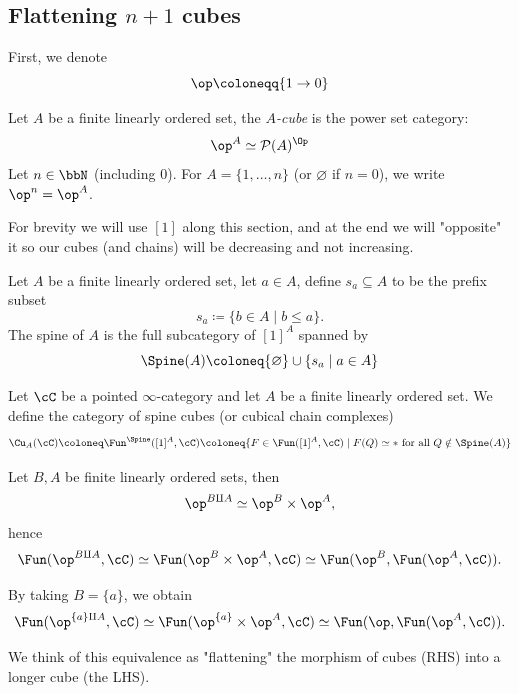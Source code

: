 \subsection{Flattening $n+1$ cubes}\label{sec:ChModels.Cub}

First, we denote
\[
    \op \coloneqq \{1 \to 0\}
\]

\begin{defn}\label{def:A_cube}
Let $A$ be a finite linearly ordered set, the \emph{$A$-cube} is the power set category:
\[
    \op^A \simeq \mathcal{P}(A)^{\Op}
\]
Let $n \in \bbN$ (including $0$). For $A = \{1, \dots, n\}$ (or $\varnothing$ if $n=0$), we write $\op^n = \op^A$.
\end{defn}

\begin{note*}
For brevity we will use $[1]$ along this section, and at the end we will "opposite" it so our cubes (and chains) will be decreasing and not increasing.
\end{note*}

\begin{defn}\label{def:spine_of_A}
Let $A$ be a finite linearly ordered set, let $a \in A$, define $s_a \subseteq A$ to be the prefix subset
\[
    s_a \coloneq \{ b \in A \mid b \leq a \}.
\]
The spine of $A$ is the full subcategory of $[1]^A$ spanned by 
\[
     \Spine(A) \coloneq \{ \varnothing \} \cup \{ s_a \mid a \in A \}
\]
\end{defn}

\begin{defn}\label{def:category_of_spine_cubes}
Let $\cC$ be a pointed $\infty$-category and let $A$ be a finite linearly ordered set. We define the category of spine cubes (or cubical chain complexes)
\[
    \Cu_A(\cC) \coloneq \Fun^{\Spine}([1]^A,\cC) \coloneq \{ F \in \Fun([1]^A,\cC) \mid F(Q) \simeq * \text{ for all } Q \notin \Spine(A) \}
\]
\end{defn}

Let $B, A$ be finite linearly ordered sets, then
\[
    \op^{B \amalg A} \simeq \op^B \times \op^A,
\]
hence
\[
    \Fun(\op^{B \amalg A},\cC) \simeq \Fun(\op^B \times \op^A,\cC) \simeq \Fun(\op^B, \Fun(\op^A, \cC)).
\]

By taking $B=\{a\}$, we obtain
\[
    \Fun(\op^{\{a\} \amalg A},\cC) \simeq \Fun(\op^{\{a\}} \times \op^A,\cC) \simeq \Fun(\op, \Fun(\op^A, \cC)).
\]

We think of this equivalence as "flattening" the morphism of cubes (RHS) into a longer cube (the LHS).

